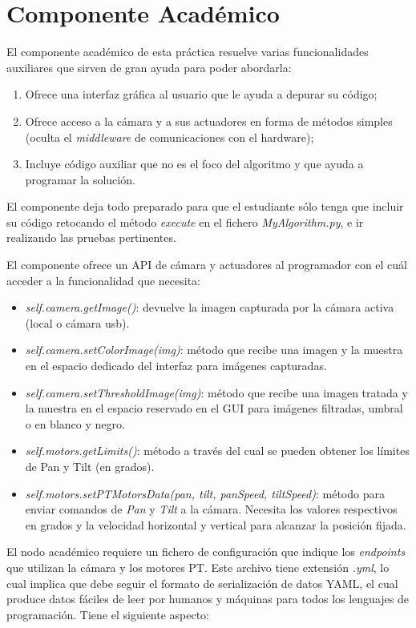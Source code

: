 \section{Componente Académico}
El componente académico de esta práctica resuelve varias funcionalidades auxiliares que sirven de gran ayuda para poder abordarla:

\begin{enumerate}[label=\alph*)]
	\item Ofrece una interfaz gráfica al usuario que le ayuda a depurar su código; 
	\item Ofrece acceso a la cámara y a sus actuadores en forma de métodos simples (oculta el \textit{middleware} de comunicaciones con el hardware);  
	\item Incluye código auxiliar que no es el foco del algoritmo y que ayuda a programar la solución.
\end{enumerate}

El componente deja todo preparado para que el estudiante sólo tenga que incluir su código retocando el método \textit{execute} en el fichero \textit{MyAlgorithm.py}, e ir realizando las pruebas pertinentes.

El componente ofrece un API de cámara y actuadores al programador con el cuál acceder a la funcionalidad que necesita:

\begin{itemize}
	\item \textit{self.camera.getImage()}: devuelve la imagen capturada por la cámara activa (local o cámara usb).
	\item \textit{self.camera.setColorImage(img)}: método que recibe una imagen y la muestra en el espacio dedicado del interfaz para imágenes capturadas.
	\item \textit{self.camera.setThresholdImage(img)}: método que recibe una imagen tratada y la muestra en el espacio reservado en el GUI para imágenes filtradas, umbral o en blanco y negro.
	\item \textit{self.motors.getLimits()}: método a través del cual se pueden obtener los límites de Pan y Tilt (en grados).
	\item \textit{self.motors.setPTMotorsData(pan, tilt, panSpeed, tiltSpeed)}: método para enviar comandos de \textit{Pan} y \textit{Tilt} a la cámara. Necesita los valores respectivos en grados y la velocidad horizontal y vertical para alcanzar la posición fijada.
\end{itemize}

El nodo académico requiere un fichero de configuración que indique los \textit{endpoints} que utilizan la cámara y los motores PT. Este archivo tiene extensión \textit{.yml}, lo cual implica que debe seguir el formato de serialización de datos YAML, el cual produce datos fáciles de leer por humanos y máquinas para todos los lenguajes de programación. Tiene el siguiente aspecto:

